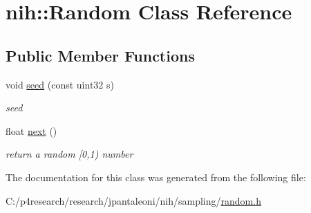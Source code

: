 \hypertarget{classnih_1_1_random}{
\section{nih\-:\-:\-Random \-Class \-Reference}
\label{classnih_1_1_random}
}
\subsection*{\-Public \-Member \-Functions}
\begin{DoxyCompactItemize}
\item 
\hypertarget{classnih_1_1_random_a037c1df5bc15ae1c6c21450130aacecc}{
void \hyperlink{classnih_1_1_random_a037c1df5bc15ae1c6c21450130aacecc}{seed} (const uint32 s)}
\label{classnih_1_1_random_a037c1df5bc15ae1c6c21450130aacecc}

\begin{DoxyCompactList}\small\item\em seed \end{DoxyCompactList}\item 
\hypertarget{classnih_1_1_random_a5ae3693b17aa9d42645fc669181843f5}{
float \hyperlink{classnih_1_1_random_a5ae3693b17aa9d42645fc669181843f5}{next} ()}
\label{classnih_1_1_random_a5ae3693b17aa9d42645fc669181843f5}

\begin{DoxyCompactList}\small\item\em return a random \mbox{[}0,1) number \end{DoxyCompactList}\end{DoxyCompactItemize}


\-The documentation for this class was generated from the following file\-:\begin{DoxyCompactItemize}
\item 
\-C\-:/p4research/research/jpantaleoni/nih/sampling/\hyperlink{random_8h}{random.\-h}\end{DoxyCompactItemize}
